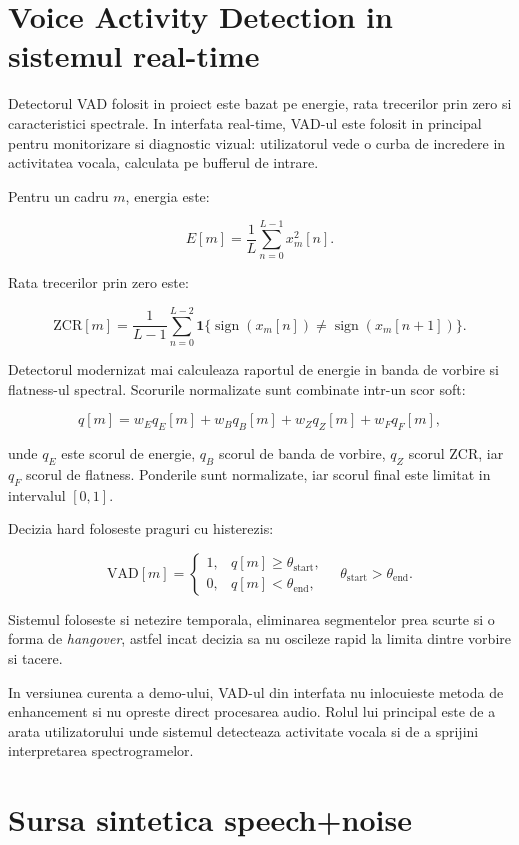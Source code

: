 \section{Voice Activity Detection in sistemul real-time}

Detectorul VAD folosit in proiect este bazat pe energie, rata trecerilor prin
zero si caracteristici spectrale. In interfata real-time, VAD-ul este folosit
in principal pentru monitorizare si diagnostic vizual: utilizatorul vede o
curba de incredere in activitatea vocala, calculata pe bufferul de intrare.

Pentru un cadru \(m\), energia este:

\[
E[m] = \frac{1}{L}\sum_{n=0}^{L-1}x_m^2[n].
\]

Rata trecerilor prin zero este:

\[
\text{ZCR}[m] =
\frac{1}{L-1}
\sum_{n=0}^{L-2}
\mathbf{1}\{\operatorname{sign}(x_m[n]) \neq
\operatorname{sign}(x_m[n+1])\}.
\]

Detectorul modernizat mai calculeaza raportul de energie in banda de vorbire
si flatness-ul spectral. Scorurile normalizate sunt combinate intr-un scor
soft:

\[
q[m] =
w_E q_E[m] +
w_B q_B[m] +
w_Z q_Z[m] +
w_F q_F[m],
\]

unde \(q_E\) este scorul de energie, \(q_B\) scorul de banda de vorbire,
\(q_Z\) scorul ZCR, iar \(q_F\) scorul de flatness. Ponderile sunt normalizate,
iar scorul final este limitat in intervalul \([0,1]\).

Decizia hard foloseste praguri cu histerezis:

\[
\text{VAD}[m] =
\begin{cases}
1, & q[m] \geq \theta_{\text{start}}, \\
0, & q[m] < \theta_{\text{end}},
\end{cases}
\quad
\theta_{\text{start}} > \theta_{\text{end}}.
\]

Sistemul foloseste si netezire temporala, eliminarea segmentelor prea scurte
si o forma de \textit{hangover}, astfel incat decizia sa nu oscileze rapid la
limita dintre vorbire si tacere.

In versiunea curenta a demo-ului, VAD-ul din interfata nu inlocuieste metoda de
enhancement si nu opreste direct procesarea audio. Rolul lui principal este de
a arata utilizatorului unde sistemul detecteaza activitate vocala si de a
sprijini interpretarea spectrogramelor.

\section{Sursa sintetica speech+noise}

